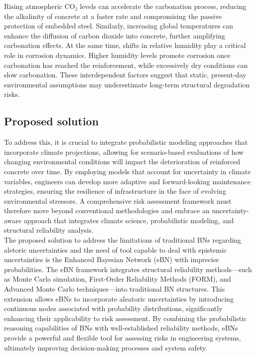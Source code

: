 Rising atmospheric CO₂ levels can accelerate the carbonation process, reducing the alkalinity of concrete at a faster rate and compromising the passive protection of embedded steel. Similarly, increasing global temperatures can enhance the diffusion of carbon dioxide into concrete, further amplifying carbonation effects. At the same time, shifts in relative humidity play a critical role in corrosion dynamics. Higher humidity levels promote corrosion once carbonation has reached the reinforcement, while excessively dry conditions can slow carbonation. These interdependent factors suggest that static, present-day environmental assumptions may underestimate long-term structural degradation risks. \\

\subsection{Proposed solution}
To address this, it is crucial to integrate probabilistic modeling approaches that incorporate climate projections, allowing for scenario-based evaluations of how changing environmental conditions will impact the deterioration of reinforced concrete over time. By employing models that account for uncertainty in climate variables, engineers can develop more adaptive and forward-looking maintenance strategies, ensuring the resilience of infrastructure in the face of evolving environmental stressors. 
A comprehensive risk assessment framework must therefore move beyond conventional methodologies and embrace an uncertainty-aware approach that integrates climate science, probabilistic modeling, and structural reliability analysis. \\
The proposed solution to address the limitations of traditional BNs regarding aletoric uncertainties and the need of tool capable to deal with epistemic uncertainties is the Enhanced Bayesian Network (eBN) with imprecise probabilities.
The eBN framework integrates structural reliability methods—such as Monte Carlo simulation, First-Order Reliability Methods (FORM), and Advanced Monte Carlo techniques—into traditional BN structures. This extension allows eBNs to incorporate aleatoric uncertainties by introducing continuous nodes associated with probability distributions, significantly enhancing their applicability to risk assessment. By combining the probabilistic reasoning capabilities of BNs with well-established reliability methods, eBNs provide a powerful and flexible tool for assessing risks in engineering systems, ultimately improving decision-making processes and system safety.\\
